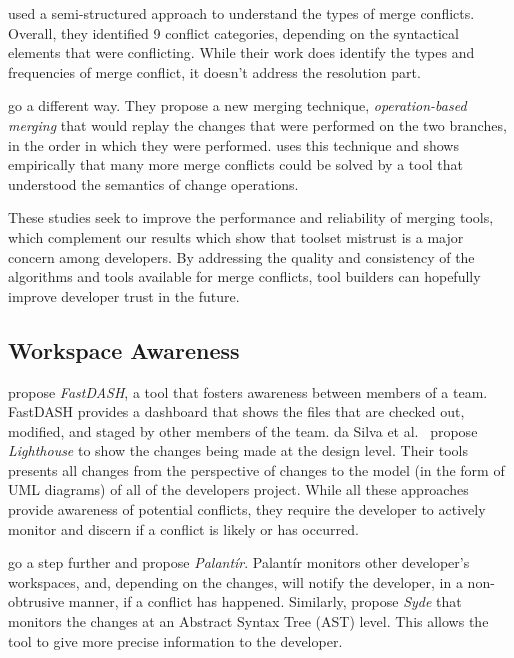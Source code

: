 \citet{accioly_understanding_2018} used a semi-structured approach to understand the types of merge conflicts.
Overall, they identified 9 conflict categories, depending on the syntactical elements that were conflicting.
While their work does identify the types and frequencies of merge conflict, it doesn't address the resolution part.

\citet{lippe_operation-based_1992} go a different way.
They propose a new merging technique, \emph{operation-based merging} that would replay the changes that were performed on the two branches, in the order in which they were performed.
\citet{dig_effective_2008} uses this technique and shows empirically that many more merge conflicts could be solved by a tool that understood the semantics of change operations.

These studies seek to improve the performance and reliability of merging tools, which complement our results which show that toolset mistrust is a major concern among developers.
By addressing the quality and consistency of the algorithms and tools available for merge conflicts, tool builders can hopefully improve developer trust in the future.

\subsection{Workspace Awareness} 

\citet{biehl_fastdash:_2007} propose \emph{FastDASH}, a tool that fosters awareness between members of a team. 
FastDASH provides a dashboard that shows the files that are checked out, modified, and staged by other members of the team.
da Silva et al.~\cite{da_silva_lighthouse:_2006} propose \emph{Lighthouse} to show the changes being made at the design level.
Their tools presents all changes from the perspective of changes to the model (in the form of UML diagrams) of all of the developers project.
While all these approaches provide awareness of potential conflicts, they require the developer to actively monitor and discern if a conflict is likely or has occurred.

\citet{palantir, sarma_palantir:_2003} go a step further and propose \emph{Palant\'{i}r}.
Palant\'{i}r monitors other developer's workspaces, and, depending on the changes, will notify the developer, in a non-obtrusive manner, if a conflict has happened.
Similarly, \citet{hattori2010syde} propose \emph{Syde} that monitors the changes at an Abstract Syntax Tree (AST) level.
This allows the tool to give more precise information to the developer.

